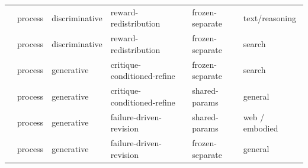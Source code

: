 \begin{table}[htbp]
{\begin{tabular}{@{}llllll@{}}
\cite{Cha24b}  & process & discriminative              & reward-redistribution                                & frozen-separate  & text/reasoning      \\
\cite{Wan26ac} & process & discriminative              & reward-redistribution                                & frozen-separate  & search              \\
\cite{Zha26am} & process & generative                  & critique-conditioned-refine                          & frozen-separate  & search              \\
\cite{Hon25c}  & process & generative                  & critique-conditioned-refine                          & shared-params    & general \\
\cite{Yua25c}  & process & generative                  & failure-driven-revision                              & shared-params    & web / embodied      \\
\cite{Wan26ad} & process & generative                  & failure-driven-revision                              & frozen-separate  & general \\
\bottomrule
\end{tabular}%
}
\end{table}